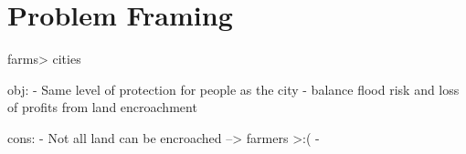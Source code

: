 \section{Problem Framing}
\label{s:prob_frame}
farms> cities

obj: 
- Same level of protection for people as the city
- balance flood risk and loss of profits from land encroachment

cons: 
- Not all land can be encroached --> farmers >:( 
-





 